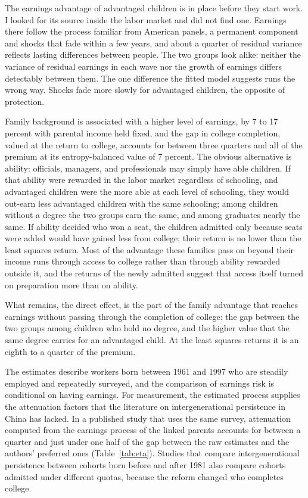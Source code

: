 \documentclass[11pt]{article}
\begin{document}
The earnings advantage of advantaged children is in place before they start work. I looked for its source inside the labor market and did not find one. Earnings there follow the process familiar from American panels, a permanent component and shocks that
fade within a few years, and about a quarter of residual
variance reflects lasting differences between people. The two groups look alike: neither the variance of residual earnings in each wave nor the growth of earnings differs detectably between them. The one difference the fitted model suggests runs the wrong way. Shocks fade more slowly for advantaged children, the opposite of protection.

Family background is associated with a higher level of earnings, by 7 to 17 percent with parental income held fixed, and the gap in college completion, valued at the return to college, accounts for between three quarters and all of the premium at its entropy-balanced value of 7 percent. The obvious alternative is ability: officials, managers, and professionals may simply have able children. If that ability were rewarded in the labor market regardless of schooling, and advantaged children were the more able at each level of schooling, they would out-earn less advantaged children with the same schooling; among children without a degree the two groups earn the same, and among graduates nearly the same. If ability decided who won a seat, the children admitted only because seats were added would have gained less from college; their return is no lower than the least squares return. Most of the advantage these families pass on beyond their income runs through access to college rather than through ability rewarded outside it, and the returns of the newly admitted suggest that access itself turned on preparation more than on ability.

What remains, the direct effect, is the part of the family advantage that reaches earnings without passing through the completion of college: the gap between the two groups among children who hold no degree, and the higher value that the same degree carries for an advantaged child. At the least squares returns it is an eighth to a quarter of the premium.

The estimates describe workers born between 1961 and 1997 who are steadily employed and repeatedly surveyed, and the comparison of earnings risk is conditional on having earnings. For measurement, the estimated process supplies the attenuation factors that the literature on intergenerational persistence in China has lacked.
In a published study that uses the same survey,
attenuation computed from the earnings process of the linked parents
accounts for between a quarter and just under one half of the gap between the raw estimates and the authors' preferred ones (Table~\ref{tab:eta}).
Studies that compare intergenerational persistence between cohorts born
before and after 1981 also compare cohorts admitted under different
quotas, because the reform changed who completes college.
\end{document}
